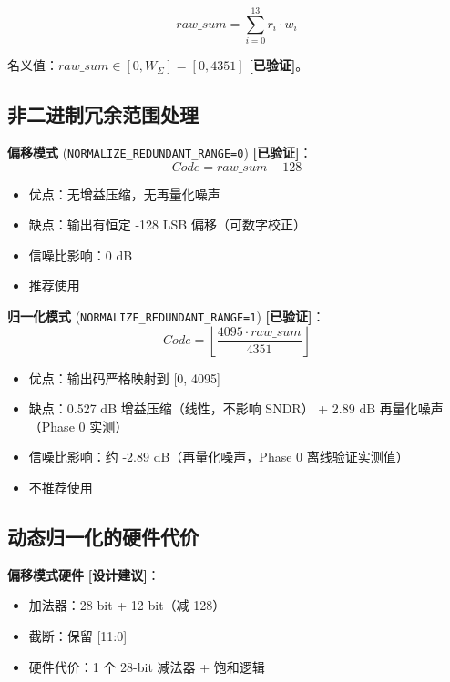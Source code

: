 \documentclass[UTF8,a4paper,11pt]{ctexart}
\newcommand{\verified}{\textcolor{verifiedgreen}{\textbf{[已验证]}}}
\newcommand{\suggested}{\textcolor{suggestblue}{\textbf{[设计建议]}}}
\begin{document}
\begin{equation}
raw\_sum = \sum_{i=0}^{13} r_i \cdot w_i
\label{eq:raw-sum-2}
\end{equation}

名义值：$raw\_sum \in [0, W_\Sigma] = [0, 4351]$ \verified。

\subsection{非二进制冗余范围处理}

\textbf{偏移模式} (\texttt{NORMALIZE\_REDUNDANT\_RANGE=0}) \verified：
\begin{equation}
Code = raw\_sum - 128
\label{eq:offset-mode-2}
\end{equation}

\begin{itemize}[leftmargin=2em]
\item 优点：无增益压缩，无再量化噪声
\item 缺点：输出有恒定 -128 LSB 偏移（可数字校正）
\item 信噪比影响：0 dB
\item 推荐使用
\end{itemize}

\textbf{归一化模式} (\texttt{NORMALIZE\_REDUNDANT\_RANGE=1}) \verified：
\begin{equation}
Code = \left\lfloor \frac{4095 \cdot raw\_sum}{4351} \right\rfloor
\label{eq:normalize-mode-2}
\end{equation}

\begin{itemize}[leftmargin=2em]
\item 优点：输出码严格映射到 [0, 4095]
\item 缺点：0.527 dB 增益压缩（线性，不影响 SNDR） + 2.89 dB 再量化噪声（Phase 0 实测）
\item 信噪比影响：约 -2.89 dB（再量化噪声，Phase 0 离线验证实测值）
\item 不推荐使用
\end{itemize}

\subsection{动态归一化的硬件代价}

\textbf{偏移模式硬件} \suggested：
\begin{itemize}[leftmargin=2em]
\item 加法器：28 bit + 12 bit（减 128）
\item 截断：保留 [11:0]
\item 硬件代价：1 个 28-bit 减法器 + 饱和逻辑
\end{itemize}
\end{document}
